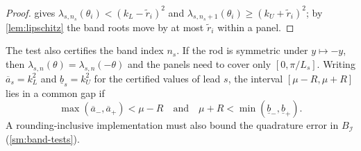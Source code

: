 \begin{proof}
 gives $\lambda_{s,n_s}(\theta_i)<(k_L-\tilde r_i)^2$ and
$\lambda_{s,n_s+1}(\theta_i)\ge(k_U+\tilde r_i)^2$; by \cref{lem:lipschitz} the
band roots move by at most $\tilde r_i$ within a panel.
\end{proof}

The test also certifies the band index $n_s$. If the rod is symmetric under
$y\mapsto-y$, then $\lambda_{s,n}(\theta)=\lambda_{s,n}(-\theta)$ and the panels
need to cover only $[0,\pi/L_s]$. Writing $\overline a_s=k_L^2$ and
$\underline b_s=k_U^2$ for the certified values of lead $s$, the interval
$[\mu-R,\mu+R]$ lies in a common gap if
\begin{equation}\label{eq:gap-condition}
  \max(\overline a_-,\overline a_+)<\mu-R
  \quad\text{and}\quad
  \mu+R<\min(\underline b_-,\underline b_+).
\end{equation}
A rounding-inclusive implementation must also bound the quadrature error in
$B_{\mathcal I}$ (\cref{sm:band-tests}).
